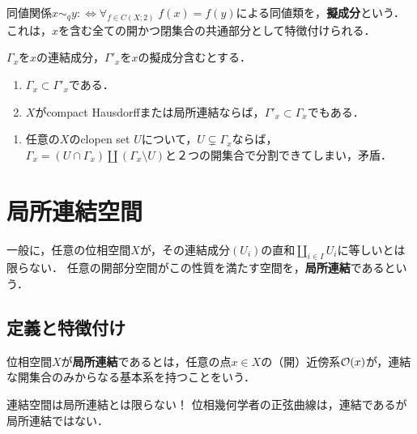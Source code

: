 \documentclass[uplatex,dvipdfmx]{jsreport}
\begin{document}
\begin{definition}
    同値関係$x\sim_qy:\Leftrightarrow \forall_{f\in C(X;2)}\;f(x)=f(y)$による同値類を，\textbf{擬成分}という．
    これは，$x$を含む全ての開かつ閉集合の共通部分として特徴付けられる．
\end{definition}

\begin{lemma}
    $\Gamma_x$を$x$の連結成分，$\Gamma'_x$を$x$の擬成分含むとする．
    \begin{enumerate}
        \item $\Gamma_x\subset\Gamma'_x$である．
        \item $X$がcompact Hausdorffまたは局所連結ならば，$\Gamma'_x\subset\Gamma_x$でもある．
    \end{enumerate}
\end{lemma}
\begin{Proof}\mbox{}
    \begin{enumerate}
        \item 任意の$X$のclopen set $U$について，$U\subsetneq\Gamma_x$ならば，$\Gamma_x=(U\cap\Gamma_x)\coprod(\Gamma_x\setminus U)$と２つの開集合で分割できてしまい，矛盾．
    \end{enumerate}
\end{Proof}

\section{局所連結空間}

\begin{tcolorbox}[colframe=ForestGreen, colback=ForestGreen!10!white,breakable,colbacktitle=ForestGreen!40!white,coltitle=black,fonttitle=\bfseries\sffamily,
title=]
    一般に，任意の位相空間$X$が，その連結成分$(U_i)$の直和$\coprod_{i\in I}U_i$に等しいとは限らない．
    任意の開部分空間がこの性質を満たす空間を，\textbf{局所連結}であるという．
\end{tcolorbox}

\subsection{定義と特徴付け}

\begin{definition}
    位相空間$X$が\textbf{局所連結}であるとは，任意の点$x\in X$の（開）近傍系$\mathcal{O}(x)$が，連結な開集合のみからなる基本系を持つことをいう．
\end{definition}
\begin{remark}
    連結空間は局所連結とは限らない！
    位相幾何学者の正弦曲線は，連結であるが局所連結ではない．
\end{remark}
\end{document}
